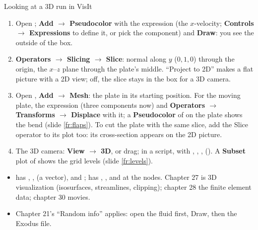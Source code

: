 \documentclass[aspectratio=169,11pt]{beamer}
\begin{document}
\begin{frame}{Looking at a 3D run in VisIt}
\label{fr:visit}
\footnotesize
\begin{enumerate}
  \item Open ; \textbf{Add $\to$ Pseudocolor} with the expression  (the $x$-velocity; \textbf{Controls $\to$ Expressions} to define it, or pick the component) and \textbf{Draw}: you see the outside of the box.
  \item \textbf{Operators $\to$ Slicing $\to$ Slice}: normal along $y$ ($0, 1, 0$) through the origin, the $x$--$z$ plane through the plate's middle. ``Project to 2D'' makes a flat picture with a 2D view; off, the slice stays in the box for a 3D camera.
  \item Open , \textbf{Add $\to$ Mesh}: the plate in its starting position. For the moving plate, the expression  (three components now) and \textbf{Operators $\to$ Transforms $\to$ Displace} with it; a \textbf{Pseudocolor} of  on the plate shows the bend (slide \ref{fr:flaps}). To cut the plate with the same slice, add the Slice operator to its plot too: its cross-section appears on the 2D picture.
  \item The 3D camera: \textbf{View $\to$ 3D}, or drag; in a script,  with , , ,  (). A \textbf{Subset} plot of  shows the grid levels (slide \ref{fr:levels}).
\end{enumerate}
\begin{itemize}
  \item {} has , ,  (a vector),  and ;  has , ,  and  at the nodes. Chapter 27 is 3D visualization (isosurfaces, streamlines, clipping); chapter 28 the finite element data; chapter 30 movies.
  \item Chapter 21's ``Random info'' applies: open the fluid first, Draw, then the Exodus file.
\end{itemize}
\end{frame}
\end{document}
